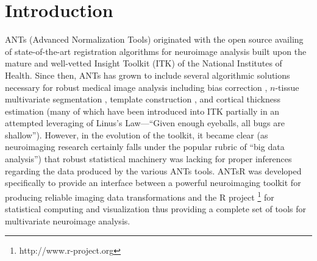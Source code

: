 \documentclass[final,5p,times,twocolumn]{elsarticle}
\begin{document}
%
%
\newpage







%
%
%

\section{Introduction}

ANTs (Advanced Normalization Tools) originated with the open source availing
of state-of-the-art registration algorithms for neuroimage analysis
\cite{avants2008a} built upon the mature and well-vetted Insight Toolkit (ITK)
of the National Institutes of Health.  Since then, ANTs has grown to include 
several algorithmic solutions necessary
for robust medical image analysis including bias correction \cite{tustison2010}, 
$n$-tissue multivariate segmentation \cite{avants2011}, template construction \cite{avants2010}, 
and cortical thickness estimation \cite{das2009} (many of which have been
introduced into ITK partially in an attempted leveraging of Linus's Law---``Given enough eyeballs, all bugs are shallow'').
However, in the evolution of the toolkit, it became clear (as neuroimaging
research certainly falls under the popular rubric of ``big data analysis'')
that robust statistical machinery was lacking for proper inferences regarding
the data produced by the various ANTs tools.
ANTsR was developed
specifically to provide an interface between a 
powerful neuroimaging toolkit for producing reliable imaging data 
transformations and the R project%
\footnote{
http://www.r-project.org
}
for statistical computing and visualization thus providing a complete
set of tools for multivariate neuroimage analysis. 
\end{document}

